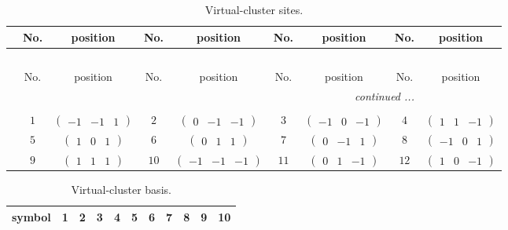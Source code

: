 \documentclass[fleqn,10pt,landscape]{article}
\begin{document}
\begin{itemize}
{
\scriptsize
\begin{center}
\renewcommand{\arraystretch}{1.7}
\begin{longtable}{ccccccccc}
\caption{Virtual-cluster sites.}
 \\
 \hline \hline
 & No. & position & No. & position & No. & position & No. & position \\ \hline \endfirsthead

\multicolumn{8}{l}{\tablename\ \thetable{}} \\
 \hline \hline
 & No. & position & No. & position & No. & position & No. & position \\ \hline \endhead

 \hline \hline
\multicolumn{8}{r}{\footnotesize\it continued ...} \\ \endfoot

 \hline \hline
\multicolumn{8}{r}{} \\ \endlastfoot

 & $ 1 $ & $ \begin{pmatrix} -1 & -1 & 1 \end{pmatrix} $ & $ 2 $ & $ \begin{pmatrix} 0 & -1 & -1 \end{pmatrix} $ & $ 3 $ & $ \begin{pmatrix} -1 & 0 & -1 \end{pmatrix} $ & $ 4 $ & $ \begin{pmatrix} 1 & 1 & -1 \end{pmatrix} $ \\
& $ 5 $ & $ \begin{pmatrix} 1 & 0 & 1 \end{pmatrix} $ & $ 6 $ & $ \begin{pmatrix} 0 & 1 & 1 \end{pmatrix} $ & $ 7 $ & $ \begin{pmatrix} 0 & -1 & 1 \end{pmatrix} $ & $ 8 $ & $ \begin{pmatrix} -1 & 0 & 1 \end{pmatrix} $ \\
& $ 9 $ & $ \begin{pmatrix} 1 & 1 & 1 \end{pmatrix} $ & $ 10 $ & $ \begin{pmatrix} -1 & -1 & -1 \end{pmatrix} $ & $ 11 $ & $ \begin{pmatrix} 0 & 1 & -1 \end{pmatrix} $ & $ 12 $ & $ \begin{pmatrix} 1 & 0 & -1 \end{pmatrix} $ \\
\end{longtable}
\end{center}
\begin{center}
\renewcommand{\arraystretch}{1.7}
\begin{longtable}{ccccccccccc}
\caption{Virtual-cluster basis.}
 \\
 \hline \hline
symbol & 1 & 2 & 3 & 4 & 5 & 6 & 7 & 8 & 9 & 10 \\ \hline \endfirsthead


\end{longtable}
\end{center}}
\end{itemize}
\end{document}
